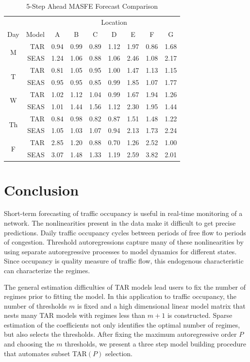 \begin{table}[htbp]
\scriptsize
\centering
\caption{5-Step Ahead MASFE Forecast Comparison}
\begin{tabular}{c|rccccccc}
  \hline
    & & \multicolumn{7}{c}{Location}\\
  \cline{5-7}
Day & Model & A & B & C & D & E & F & G \\ 
  \hline
  \multirow{2}{*}{M} & TAR & 0.94 & 0.99 & 0.89 & 1.12 & 1.97 & 0.86 & 1.68 \\ 
   & SEAS & 1.24 & 1.06 & 0.88 & 1.06 & 2.46 & 1.08 & 2.17 \\ 
  \hline
  \multirow{2}{*}{T}  & TAR & 0.81 & 1.05 & 0.95 & 1.00 & 1.47 & 1.13 & 1.15 \\ 
   & SEAS & 0.95 & 0.95 & 0.85 & 0.99 & 1.85 & 1.07 & 1.77 \\ 
  \hline
  \multirow{2}{*}{W}  & TAR & 1.02 & 1.12 & 1.04 & 0.99 & 1.67 & 1.94 & 1.26 \\ 
   & SEAS & 1.01 & 1.44 & 1.56 & 1.12 & 2.30 & 1.95 & 1.44 \\ 
  \hline
  \multirow{2}{*}{Th}  & TAR & 0.84 & 0.98 & 0.82 & 0.87 & 1.51 & 1.48 & 1.22 \\ 
   & SEAS & 1.05 & 1.03 & 1.07 & 0.94 & 2.13 & 1.73 & 2.24 \\ 
  \hline
  \multirow{2}{*}{F}  & TAR & 2.85 & 1.20 & 0.88 & 0.70 & 1.26 & 2.52 & 1.00 \\ 
   & SEAS & 3.07 & 1.48 & 1.33 & 1.19 & 2.59 & 3.82 & 2.01 \\ 
   \hline
\end{tabular}
\label{tab:trafficmase5}
\end{table}




\section{Conclusion}
Short-term forecasting of traffic occupancy is useful in real-time monitoring of a network. The nonlinearities present in the data make it difficult to get precise predictions. Daily traffic occupancy cycles between periods of free flow to periods of congestion. Threshold autoregressions capture many of these nonlinearities by using separate autoregressive processes to model dynamics for different states. Since occupancy is quality measure of traffic flow, this endogenous characteristic can characterize the regimes. 

The general estimation difficulties of TAR models lead users to fix the number of regimes prior to fitting the model. In this application to traffic occupancy, the number of thresholds $m$ is fixed and a high dimensional linear model matrix that nests many TAR models with regimes less than $m+1$ is constructed. Sparse estimation of the coefficients not only identifies the optimal number of regimes, but also selects the thresholds. After fixing the maximum autoregressive order $P$ and choosing the $m$ thresholds, we present a three step model building procedure that automates subset TAR$(P)$ selection. 

